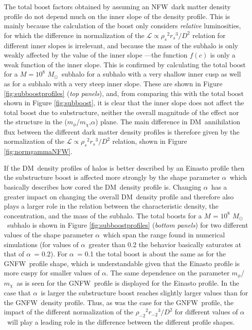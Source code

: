 \documentclass[aps,prd,twocolumn,amsmath,amssymb,floatfix,nofootinbib,10pt]{revtex4}
\newcommand{\NFW}{NFW}
\newcommand{\GNFW}{G\NFW}
\newcommand{\DM}{DM}
\newcommand{\mdm}{\ensuremath{m_{\chi}}}
\newcommand{\mv}{\ensuremath{m_{\phi}}}
\newcommand{\lum}{\ensuremath{\mathcal{L}}}
\newcommand{\rhos}{\ensuremath{\rho_s}}
\newcommand{\rs}{\ensuremath{r_s}}
\newcommand{\dist}{\ensuremath{D}}
\newcommand{\rhominustwo}{\ensuremath{\rho_{-2}}}
\newcommand{\rminustwo}{\ensuremath{r_{-2}}}
\newcommand{\alphaEinasto}{\ensuremath{\alpha}}
\newcommand{\Msol}{\ensuremath{M_{\odot}}}
\newcommand{\Msun}{\Msol}
\begin{document}
\endgroup




The total boost factors obtained by assuming an \NFW\ dark matter
density profile do not depend much on the inner slope of the density
profile. This is mainly because the calculation of the boost only
considers \emph{relative} luminosities, for which the difference in
normalization of the $\lum \propto \rhos^2 \rs^3/\dist^2$ relation for
different inner slopes is irrelevant, and because the mass of the
subhalo is only weakly affected by the value of the inner slope ---the
function $f(c)$ is only a weak function of the inner slope. This is
confirmed by calculating the total boost for a $M = 10^8$ \Msun\
subhalo for a subhalo with a very shallow inner cusp as well as for a
subhalo with a very steep inner slope. These are shown in Figure
\ref{fig:subboostprofiles} (\emph{top panels}), and, from comparing
this with the total boost shown in Figure \ref{fig:subboost}, it is
clear that the inner slope does not affect the total boost due to
substructure, neither the overall magnitude of the effect nor the
structure in the (\mv/\mdm,$\alpha$) plane. The main difference in
\DM\ annihilation flux between the different dark matter density
profiles is therefore given by the normalization of the $\lum \propto
\rhos^2 \rs^3/\dist^2$ relation, shown in Figure
\ref{fig:normgammaNFW}.

If the \DM\ density profiles of halos is better described by an
Einasto profile then the substructure boost is affected more strongly
by the shape parameter \alphaEinasto\, which basically describes how
cored the \DM\ density profile is. Changing \alphaEinasto\ has a
greater impact on changing the overall \DM\ density profile and
therefore also plays a larger role in the relation between the
characteristic density, the concentration, and the mass of the
subhalo. The total boosts for a $M$ = $10^8$ \Msun\ subhalo is shown
in Figure \ref{fig:subboostprofiles} (\emph{bottom panels}) for two
different values of the shape parameter \alphaEinasto\, which span the
range found in numerical simulations (for values of \alphaEinasto\
greater than 0.2 the behavior basically saturates at that of
\alphaEinasto\ = 0.2). For \alphaEinasto\ = 0.1 the total boost is
about the same as for the \GNFW\ profile shape, which is
understandable given that the Einasto profile is more cuspy for
smaller values of \alphaEinasto. The same dependence on the parameter
\mv/\mdm\ as is seen for the \GNFW\ profile is displayed for the
Einasto profile. In the case that \alphaEinasto\ is larger the
substructure boost reaches slightly larger values than for the \GNFW\
density profile. Thus, as was the case for the \GNFW\ profile, the
impact of the different normalization of the
$\rhominustwo^2\rminustwo^3/\dist^2$ for different values of
\alphaEinasto\ will play a leading role in the difference between the
different profile shapes.
\end{document}
